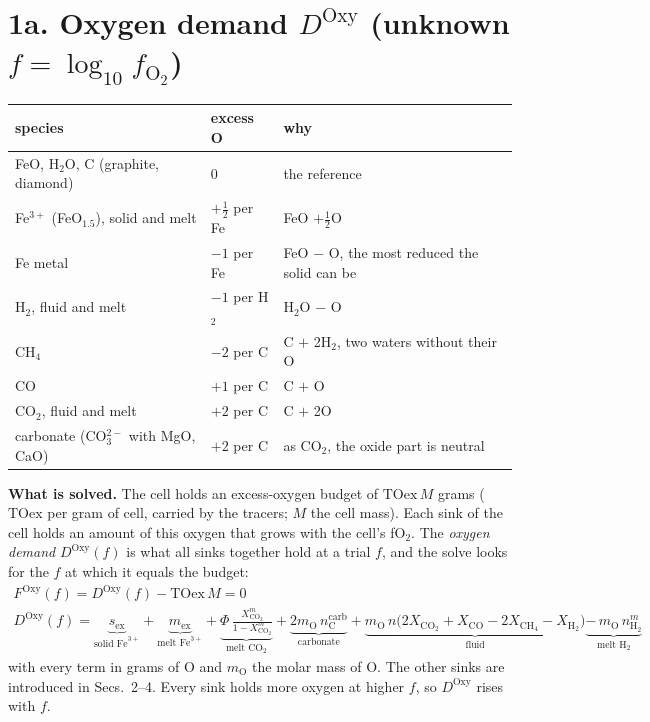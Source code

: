 \documentclass[11pt]{article}
\newcommand{\fOt}{f_{\mathrm{O_2}}}
\newcommand{\mO}{m_{\mathrm{O}}}
\newcommand{\Xm}[1]{X^{m}_{\mathrm{#1}}}
\begin{document}
\section*{1a. Oxygen demand $D^{\mathrm{Oxy}}$ \quad (unknown $f=\log_{10}\fOt$)}
\vspace*{\fill}
{\small\setlength{\abovedisplayskip}{13pt}\setlength{\belowdisplayskip}{13pt}\setlength{\abovedisplayshortskip}{13pt}\setlength{\belowdisplayshortskip}{13pt}
\begin{center}\renewcommand{\arraystretch}{1.25}
\begin{tabular}{@{}l l l@{}}
  \hline
  species & excess O & why \\
  \hline
  FeO, H$_2$O, C (graphite, diamond) & 0 & the reference \\
  Fe$^{3+}$ (FeO$_{1.5}$), solid and melt & $+\tfrac12$ per Fe & FeO $+\tfrac12$O \\
  Fe metal & $-1$ per Fe & FeO $-$ O, the most reduced the solid can be \\
  H$_2$, fluid and melt & $-1$ per H$_2$ & H$_2$O $-$ O \\
  CH$_4$ & $-2$ per C & C $+$ 2H$_2$, two waters without their O \\
  CO & $+1$ per C & C $+$ O \\
  CO$_2$, fluid and melt & $+2$ per C & C $+$ 2O \\
  carbonate (CO$_3^{2-}$ with MgO, CaO) & $+2$ per C & as CO$_2$, the oxide part is neutral \\
  \hline
\end{tabular}
\end{center}

\textbf{What is solved.} The cell holds an excess-oxygen budget of $\mathrm{TOex}\,M$ grams ($\mathrm{TOex}$ per gram of cell, carried by the tracers; $M$ the cell mass). Each sink of the cell holds an amount of this oxygen that grows with the cell's fO$_2$. The \emph{oxygen demand} $D^{\mathrm{Oxy}}(f)$ is what all sinks together hold at a trial $f$, and the solve looks for the $f$ at which it equals the budget:
\begin{gather}
  F^{\mathrm{Oxy}}(f)=D^{\mathrm{Oxy}}(f)-\mathrm{TOex}\,M=0\\[14pt]
  D^{\mathrm{Oxy}}(f)=\underbrace{s_{\mathrm{ex}}}_{\text{solid Fe}^{3+}}
  +\underbrace{m_{\mathrm{ex}}}_{\text{melt Fe}^{3+}}
  +\underbrace{\Phi\,\frac{\Xm{CO_2}}{1-\Xm{CO_2}}}_{\text{melt CO}_2}
  +\underbrace{2\mO\,n_{\mathrm{C}}^{\mathrm{carb}}}_{\text{carbonate}}
  +\underbrace{\mO\,n\big(2X_{\mathrm{CO_2}}+X_{\mathrm{CO}}-2X_{\mathrm{CH_4}}-X_{\mathrm{H_2}}\big)}_{\text{fluid}}
  \underbrace{-\,\mO\,n^{m}_{\mathrm{H_2}}}_{\text{melt H}_2}
\end{gather}
with every term in grams of O and $\mO$ the molar mass of O. The other sinks are introduced in Secs.~2--4. Every sink holds more oxygen at higher $f$, so $D^{\mathrm{Oxy}}$ rises with $f$.
}
\end{document}
